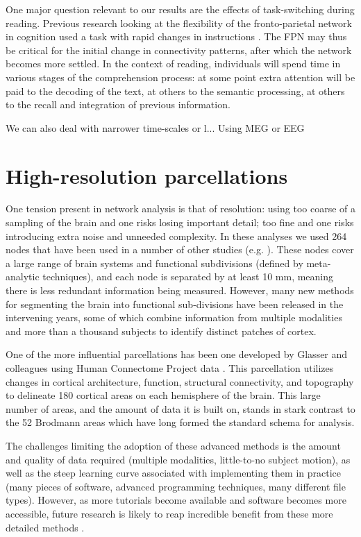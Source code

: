 One major question relevant to our results are the effects of task-switching during reading. Previous research looking at the flexibility of the fronto-parietal network in cognition used a task with rapid changes in instructions \citep{Cole2013}. The FPN may thus be critical for the initial change in connectivity patterns, after which the network becomes more settled. In the context of reading, individuals will spend time in various stages of the comprehension process: at some point extra attention will be paid to the decoding of the text, at others to the semantic processing, at others to the recall and integration of previous information.

We can also deal with narrower time-scales or 
l... Using MEG or EEG

\section{High-resolution parcellations}

One tension present in network analysis is that of resolution: using too coarse of a sampling of the brain and one risks losing important detail; too fine and one risks introducing extra noise and unneeded complexity. In these analyses we used 264 nodes that have been used in a number of other studies (e.g. \citep{Power2013, Cole2014}). These nodes cover a large range of brain systems and functional subdivisions (defined by meta-analytic techniques), and each node is separated by at least 10 mm, meaning there is less redundant information being measured. However, many new methods for segmenting the brain into functional sub-divisions have been released in the intervening years, some of which combine information from multiple modalities and more than a thousand subjects to identify distinct patches of cortex. 

One of the more influential parcellations has been one developed by Glasser and colleagues using Human Connectome Project data \citep{Glasser2016}. This parcellation utilizes changes in cortical architecture, function, structural connectivity, and topography to delineate 180 cortical areas on each hemisphere of the brain. This large number of areas, and the amount of data it is built on, stands in stark contrast to the 52 Brodmann areas which have long formed the standard schema for analysis. 

The challenges limiting the adoption of these advanced methods is the amount and quality of data required (multiple modalities, little-to-no subject motion), as well as the steep learning curve associated with implementing them in practice (many pieces of software, advanced programming techniques, many different file types). However, as more tutorials become available and software becomes more accessible, future research is likely to reap incredible benefit from these more detailed methods \citep{PoldrackFarah2015}.

